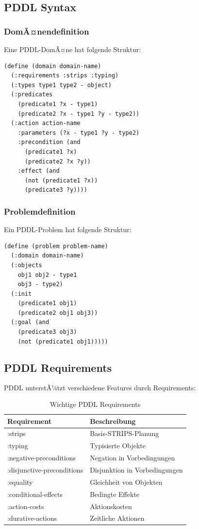 ﻿\documentclass[a4paper,12pt]{article}
\theoremstyle{definition}
\begin{document}
\subsection{PDDL Syntax}

\subsubsection{DomÃ¤nendefinition}

Eine PDDL-DomÃ¤ne hat folgende Struktur:

\begin{lstlisting}[language=PDDL, caption=PDDL DomÃ¤nen-Template]
(define (domain domain-name)
  (:requirements :strips :typing)
  (:types type1 type2 - object)
  (:predicates 
    (predicate1 ?x - type1)
    (predicate2 ?x - type1 ?y - type2))
  (:action action-name
    :parameters (?x - type1 ?y - type2)
    :precondition (and
      (predicate1 ?x)
      (predicate2 ?x ?y))
    :effect (and
      (not (predicate1 ?x))
      (predicate3 ?y))))
\end{lstlisting}

\subsubsection{Problemdefinition}

Ein PDDL-Problem hat folgende Struktur:

\begin{lstlisting}[language=PDDL, caption=PDDL Problem-Template]
(define (problem problem-name)
  (:domain domain-name)
  (:objects
    obj1 obj2 - type1
    obj3 - type2)
  (:init
    (predicate1 obj1)
    (predicate2 obj1 obj3))
  (:goal (and
    (predicate3 obj3)
    (not (predicate1 obj1)))))
\end{lstlisting}

\subsection{PDDL Requirements}

PDDL unterstÃ¼tzt verschiedene Features durch Requirements:

\begin{table}[h]
	\centering
	\caption{Wichtige PDDL Requirements}
	\label{tab:pddl_requirements}
	\begin{tabular}{ll}
		\toprule
		Requirement & Beschreibung \\
		\midrule
		:strips & Basis-STRIPS-Planung \\
		:typing & Typisierte Objekte \\
		:negative-preconditions & Negation in Vorbedingungen \\
		:disjunctive-preconditions & Disjunktion in Vorbedingungen \\
		:equality & Gleichheit von Objekten \\
		:conditional-effects & Bedingte Effekte \\
		:action-costs & Aktionskosten \\
		:durative-actions & Zeitliche Aktionen \\
		\bottomrule
	\end{tabular}
\end{table}
\end{document}
